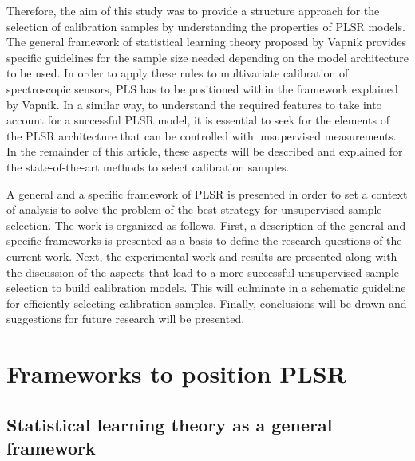 \documentclass[journal=ancham,manuscript=article]{achemso}
\begin{document}
Therefore, the aim of this study was to provide a structure approach for the selection of calibration samples by understanding the properties of PLSR models. The general framework of statistical learning theory proposed by Vapnik provides specific guidelines for the sample size needed depending on the model architecture to be used\cite{Vapnik2019, Vapnik2000}. In order to apply these rules to multivariate calibration of spectroscopic sensors, PLS has to be positioned within the framework explained by Vapnik. In a similar way, to understand the required features to take into account for a successful PLSR model, it is essential to seek for the elements of the PLSR architecture that can be controlled with unsupervised measurements. In the remainder of this article, these aspects will be described and explained for the state-of-the-art methods to select calibration samples.

A general and a specific framework of PLSR is presented in order to set a context of analysis to solve the problem of the best strategy for unsupervised sample selection. The work is organized as follows. First, a description of the general and specific frameworks is presented as a basis to define the research questions of the current work. Next, the experimental work and results are presented along with the discussion of the aspects that lead to a more successful unsupervised sample selection to build calibration models. This will culminate in a schematic guideline for efficiently selecting calibration samples. Finally, conclusions will be drawn and suggestions for future research will be presented.


\section{Frameworks to position PLSR}

\subsection{Statistical learning theory as a general framework}
\end{document}
